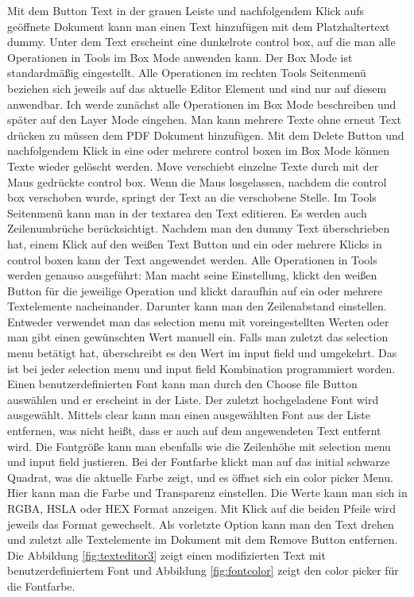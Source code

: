 Mit dem Button Text in der grauen Leiste und nachfolgendem Klick aufs geöffnete Dokument kann man einen Text hinzufügen mit dem Platzhaltertext dummy. Unter dem Text erscheint eine dunkelrote control box, auf die man alle Operationen in Tools im Box Mode anwenden kann. Der Box Mode ist standardmäßig eingestellt. Alle Operationen im rechten Tools Seitenmenü beziehen sich jeweils auf das aktuelle Editor Element und sind nur auf diesem anwendbar. Ich werde zunächst alle Operationen im Box Mode beschreiben und später auf den Layer Mode eingehen. Man kann mehrere Texte ohne erneut Text drücken zu müssen dem PDF Dokument hinzufügen. Mit dem Delete Button und nachfolgendem Klick in eine oder mehrere control boxen im Box Mode können Texte wieder gelöscht werden. Move verschiebt einzelne Texte durch mit der Maus gedrückte control box. Wenn die Maus losgelassen, nachdem die control box verschoben wurde, springt der Text an die verschobene Stelle. Im Tools Seitenmenü kann man in der textarea den Text editieren. Es werden auch Zeilenumbrüche berücksichtigt. Nachdem man den dummy Text überschrieben hat, einem Klick auf den weißen Text Button und ein oder mehrere Klicks in control boxen kann der Text angewendet werden. Alle Operationen in Tools werden genauso ausgeführt: Man macht seine Einstellung, klickt den weißen Button für die jeweilige Operation und klickt daraufhin auf ein oder mehrere Textelemente nacheinander. Darunter kann man den Zeilenabstand einstellen. Entweder verwendet man das selection menu mit voreingestellten Werten oder man gibt einen gewünschten Wert manuell ein. Falls man zuletzt das selection menu betätigt hat, überschreibt es den Wert im input field und umgekehrt. Das ist bei jeder selection menu und input field Kombination programmiert worden. Einen benutzerdefinierten Font kann man durch den Choose file Button auswählen und er erscheint in der Liste. Der zuletzt hochgeladene Font wird ausgewählt. Mittels clear kann man einen ausgewählten Font aus der Liste entfernen, was nicht heißt, dass er auch auf dem angewendeten Text entfernt wird. Die Fontgröße kann man ebenfalls wie die Zeilenhöhe mit selection menu und input field justieren. Bei der Fontfarbe klickt man auf das initial schwarze Quadrat, was die aktuelle Farbe zeigt, und es öffnet sich ein color picker Menu. Hier kann man die Farbe und Transparenz einstellen. Die Werte kann man sich in RGBA, HSLA oder HEX Format anzeigen. Mit Klick auf die beiden Pfeile wird jeweils das Format gewechselt. Als vorletzte Option kann man den Text drehen und zuletzt alle Textelemente im Dokument mit dem Remove Button entfernen.
Die Abbildung \ref{fig:texteditor3} zeigt einen modifizierten Text mit benutzerdefiniertem Font und Abbildung \ref{fig:fontcolor} zeigt den color picker für die Fontfarbe.

